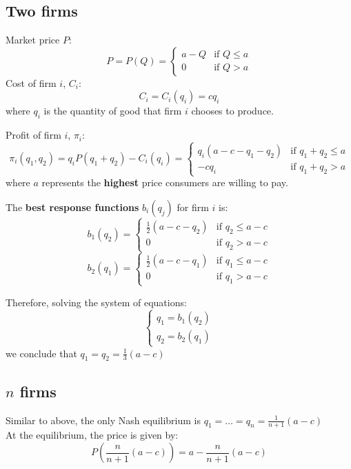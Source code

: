 \documentclass[11pt,a4paper]{article}
\begin{document}
\subsection{Two firms}
Market price $P$:
\[
P = P(Q) = 
\begin{cases}
    a - Q & \text{if } Q \leqslant a \\
    0     & \text{if } Q > a 
    \end{cases}
\]
Cost of firm $i$, $C_i$:
\[
C_i = C_i(q_i) = cq_i 
\]
where $q_i$ is the quantity of good that firm $i$ chooses to produce. \par

Profit of firm $i$, $\pi_i$:
\[
\pi_i(q_1, q_2) = q_i P(q_1 + q_2) - C_i(q_i) =
\begin{cases}
    q_i (a - c - q_1 - q_2) & \text{if } q_1 + q_2 \leqslant a \\
    -cq_i                   & \text{if } q_1 + q_2 > a
\end{cases}
\]
where $a$ represents the \textbf{highest} price consumers are willing to pay. \par

The \textbf{best response functions} $b_i(q_j)$ for firm $i$ is:
\[
b_1(q_2) =
\begin{cases}
    \frac{1}{2}(a - c - q_2) & \text{if } q_2 \leqslant a - c \\
    0                        & \text{if } q_2 > a - c
\end{cases}
\]
\[
b_2(q_1) =
\begin{cases}
    \frac{1}{2}(a - c - q_1) & \text{if } q_1 \leqslant a - c \\
    0                        & \text{if } q_1 > a - c
\end{cases}
\]

Therefore, solving the system of equations:
\[
\begin{cases}
    q_1 = b_1(q_2) \\
    q_2 = b_2(q_1)
\end{cases}
\]
we conclude that $q_1 = q_2 = \frac{1}{3}(a - c)$

\subsection{\texorpdfstring{$n$ firms}{n firms}}
Similar to above, the only Nash equilibrium is $q_1 = \dots = q_n = \frac{1}{n+1} (a - c)$ \\
At the equilibrium, the price is given by:
\[
P(\frac{n}{n+1} (a - c)) = a - \frac{n}{n+1} (a - c)
\]
\end{document}
